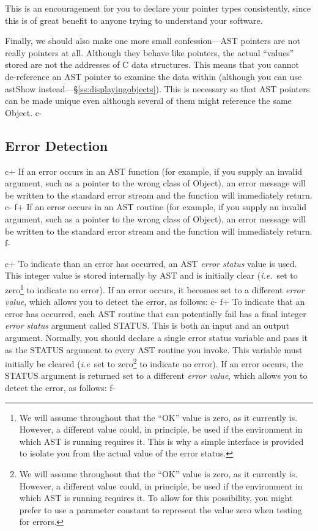 \documentclass[twoside,11pt]{article}
\newcommand{\secref}[1]{\S\ref{#1}}
\newcommand{\secref}[1]{\ref{#1}}
\begin{document}
This is an encouragement for you to declare your pointer types
consistently, since this is of great benefit to anyone trying to
understand your software.

Finally, we should also make one more small confession---AST pointers
are not really pointers at all.  Although they behave like pointers,
the actual ``values'' stored are not the addresses of C data
structures. This means that you cannot de-reference an AST pointer to
examine the data within (although you can use astShow
instead---\secref{ss:displayingobjects}). This is necessary so that AST
pointers can be made unique even although several of them might
reference the same Object.
c-

\subsection{\label{ss:errordetection}Error Detection}

c+
If an error occurs in an AST function (for example, if you supply an
invalid argument, such as a pointer to the wrong class of Object), an
error message will be written to the standard error stream and the
function will immediately return.
c-
f+
If an error occurs in an AST routine (for example, if you supply an
invalid argument, such as a pointer to the wrong class of Object), an
error message will be written to the standard error stream and the
function will immediately return.
f-

c+
To indicate than an error has occurred, an AST {\em{error status}}
value is used. This integer value is stored internally by AST and is
initially clear ({\em{i.e.}}\ set to zero\footnote{We will assume
throughout that the ``OK'' value is zero, as it currently is. However,
a different value could, in principle, be used if the environment in
which AST is running requires it. This is why a simple interface is
provided to isolate you from the actual value of the error status.}
to indicate no error). If an error occurs, it becomes set to a
different {\em{error value}}, which allows you to detect the error, as
follows:
c-
f+
To indicate that an error has occurred, each AST routine that can
potentially fail has a final integer {\em{error status}} argument
called STATUS.  This is both an input and an output argument.
Normally, you should declare a single error status variable and pass
it as the STATUS argument to every AST routine you invoke.  This
variable must initially be cleared ({\em{i.e}}\ set to
zero\footnote{We will assume throughout that the ``OK'' value is zero,
as it currently is. However, a different value could, in principle, be
used if the environment in which AST is running requires it. To allow
for this possibility, you might prefer to use a parameter constant to
represent the value zero when testing for errors.} to indicate no
error).  If an error occurs, the STATUS argument is returned set to a
different {\em{error value}}, which allows you to detect the error, as
follows:
f-
\end{document}
